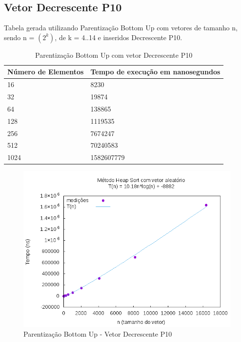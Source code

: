 \documentclass[12pt,a4paper,twoside]{report}
\begin{document}
\subsection{Vetor Decrescente P10}
Tabela gerada utilizando Parentização Bottom Up com vetores de tamanho n, sendo n = $(2^k)$, de k = 4..14 e inseridos Decrescente P10.
\begin{table}[H]
\centering
\caption{Parentização Bottom Up com vetor Decrescente P10}
\label{my-label}
\begin{tabular}{|l|l|}
\hline
\multicolumn{1}{|c|}{\textbf{Número de Elementos}} & \multicolumn{1}{c|}{\textbf{Tempo de execução em nanosegundos}} \\ \hline
16 & 8230 \\ \hline
32 & 19874 \\ \hline
64 & 138865 \\ \hline
128 & 1119535 \\ \hline
256 & 7674247 \\ \hline
512 & 70240583 \\ \hline
1024 & 1582607779 \\ \hline
\end{tabular}
\end{table}

\begin{figure}[H]
    \centering
    \includegraphics[width=0.7\linewidth]{graficos/HeapSort/vIntAleatorio/vIntAleatorio.png}
  \caption{Parentização Bottom Up - Vetor Decrescente P10}
\end{figure}
\end{document}
